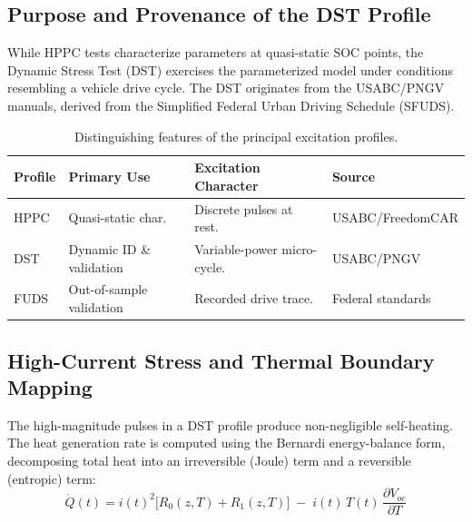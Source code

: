 \subsection{Purpose and Provenance of the DST Profile}

While HPPC tests characterize parameters at quasi-static SOC points, the Dynamic Stress Test (DST) exercises the parameterized model under conditions resembling a vehicle drive cycle. The DST originates from the USABC/PNGV manuals, derived from the Simplified Federal Urban Driving Schedule (SFUDS). 

\begin{table}[htbp]
\centering
\small
\caption{Distinguishing features of the principal excitation profiles.}
\label{tab:10_profiles}
\renewcommand{\arraystretch}{1.3}
\begin{tabularx}{\textwidth}{@{}l >{\raggedright\arraybackslash}X >{\raggedright\arraybackslash}X l@{}}
\toprule
\textbf{Profile} & \textbf{Primary Use} & \textbf{Excitation Character} & \textbf{Source} \\
\midrule
HPPC & Quasi-static char. & Discrete pulses at rest. & USABC/FreedomCAR \\
DST & Dynamic ID \& validation & Variable-power micro-cycle. & USABC/PNGV \\
FUDS & Out-of-sample validation & Recorded drive trace. & Federal standards \\
\bottomrule
\end{tabularx}
\end{table}

\subsection{High-Current Stress and Thermal Boundary Mapping}
\label{sec:10_3_2}

The high-magnitude pulses in a DST profile produce non-negligible self-heating. The heat generation rate is computed using the Bernardi energy-balance form, decomposing total heat into an irreversible (Joule) term and a reversible (entropic) term:
\begin{equation}
\dot Q(t) = i(t)^2 \Big[R_0(z,T) + R_1(z,T)\Big] \;-\; i(t)\, T(t) \, \frac{\partial V_{oc}}{\partial T}
\label{eq:10_bernardi}
\end{equation}

